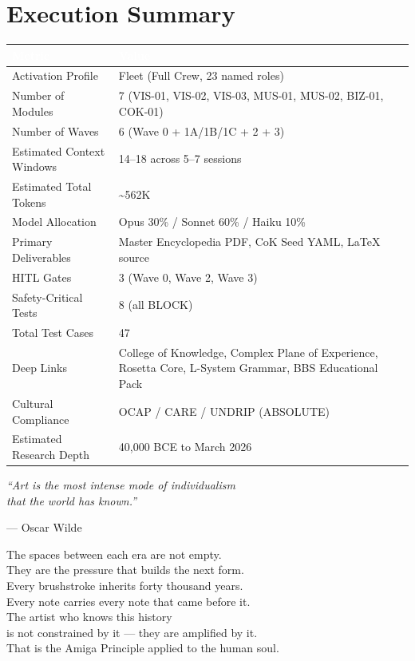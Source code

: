 \documentclass[11pt,letterpaper]{article}
\newcommand{\tableheader}[1]{\textbf{\sffamily\textcolor{white}{#1}}}
\begin{document}
\section{Execution Summary}

\begin{tabularx}{\textwidth}{L{5cm}X}
\toprule
{}
\tableheader{Metric} & \tableheader{Value} \\
\midrule
Activation Profile & Fleet (Full Crew, 23 named roles) \\
Number of Modules & 7 (VIS-01, VIS-02, VIS-03, MUS-01, MUS-02, BIZ-01, COK-01) \\
Number of Waves & 6 (Wave 0 + 1A/1B/1C + 2 + 3) \\
Estimated Context Windows & 14--18 across 5--7 sessions \\
Estimated Total Tokens & \textasciitilde562K \\
Model Allocation & Opus 30\% / Sonnet 60\% / Haiku 10\% \\
Primary Deliverables & Master Encyclopedia PDF, CoK Seed YAML, LaTeX source \\
HITL Gates & 3 (Wave 0, Wave 2, Wave 3) \\
Safety-Critical Tests & 8 (all BLOCK) \\
Total Test Cases & 47 \\
Deep Links & College of Knowledge, Complex Plane of Experience, Rosetta Core, L-System Grammar, BBS Educational Pack \\
Cultural Compliance & OCAP / CARE / UNDRIP (ABSOLUTE) \\
Estimated Research Depth & 40,000 BCE to March 2026 \\
\bottomrule
\end{tabularx}

\vspace{2em}

\begin{quotebox}
\centering
{\large\sffamily\itshape\textcolor{primary}{``Art is the most intense mode of individualism\\
that the world has known.''}}

\vspace{0.5em}
{\small\sffamily\textcolor{subtlegray}{--- Oscar Wilde}}

\vspace{1em}
{\normalsize\sffamily\textcolor{tertiary}{The spaces between each era are not empty.\\
They are the pressure that builds the next form.\\
Every brushstroke inherits forty thousand years.\\
Every note carries every note that came before it.\\
The artist who knows this history\\
is not constrained by it --- they are amplified by it.\\
That is the Amiga Principle applied to the human soul.}}
\end{quotebox}
\end{document}
